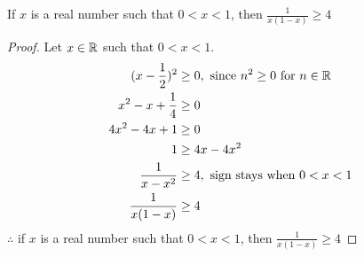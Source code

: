 \begin{enumerate}
   If $x$ is a real number such that $0 < x < 1$, then $\frac{1}{x(1-x)} \geq 4$
  \begin{proof}
    Let $x \in \mathbb{R}$ such that $0 < x < 1$.
    \begin{align*}
      (x-\frac{1}{2})^2 & \geq 0,~\text{since $n^2 \geq 0$ for $n \in \mathbb{R}$} \\
      x^2-x+\frac{1}{4} & \geq 0                                               \\
      4x^2-4x+1         & \geq 0                                               \\
      1                 & \geq 4x - 4x^2                                       \\
      \frac{1}{x-x^2}   & \geq 4,~\text{sign stays when $0 < x < 1$}           \\
      \frac{1}{x(1-x)}  & \geq 4
    \end{align*}
    $\therefore$ if $x$ is a real number such that $0 < x < 1$, then $\frac{1}{x(1-x)} \geq 4$
  \end{proof}
\end{enumerate}

